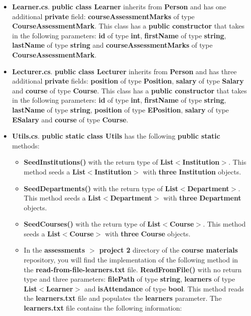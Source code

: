 \documentclass{article}
\begin{document}
\begin{itemize}
\begin{itemize}
        \item \textbf{Learner.cs}. \textbf{public class Learner} inherits from \textbf{Person} and has one additional \textbf{private} field: \textbf{courseAssessmentMarks} of type \textbf{CourseAssessmentMark}. This class has a \textbf{public constructor} that takes in the following parameters: \textbf{id} of type \textbf{int}, \textbf{firstName} of type \textbf{string}, \textbf{lastName} of type \textbf{string} and \textbf{courseAssessmentMarks} of type \textbf{CourseAssessmentMark}. 
        \item \textbf{Lecturer.cs}. \textbf{public class Lecturer} inherits from \textbf{Person} and has three additional \textbf{private} fields: \textbf{position} of type \textbf{Position}, \textbf{salary} of type \textbf{Salary} and \textbf{course} of type \textbf{Course}. This class has a \textbf{public constructor} that takes in the following parameters: \textbf{id} of type \textbf{int}, \textbf{firstName} of type \textbf{string}, \textbf{lastName} of type \textbf{string}, \textbf{position} of type \textbf{EPosition}, \textbf{salary} of type \textbf{ESalary} and \textbf{course} of type \textbf{Course}.
        \item \textbf{Utils.cs}. \textbf{public static class Utils} has the following \textbf{public static} methods:
        \begin{itemize}
            \item \textbf{SeedInstitutions()} with the return type of \textbf{List$<$Institution$>$}. This method seeds a \textbf{List$<$Institution$>$} with \textbf{three} \textbf{Institution} objects.
            \item \textbf{SeedDepartments()} with the return type of \textbf{List$<$Department$>$}. This method seeds a \textbf{List$<$Department$>$} with \textbf{three} \textbf{Department} objects.
            \item \textbf{SeedCourses()} with the return type of \textbf{List$<$Course$>$}. This method seeds a \textbf{List$<$Course$>$} with \textbf{three} \textbf{Course} objects. 
            \item In the \textbf{assessments $>$ project 2} directory of the \textbf{course materials} repository, you will find the implementation of the following method in the \textbf{read-from-file-learners.txt} file.
            \textbf{ReadFromFile()} with no return type and three parameters: \textbf{filePath} of type \textbf{string}, \textbf{learners} of type \textbf{List$<$Learner$>$} and \textbf{isAttendance} of type \textbf{bool}. This method reads the \textbf{learners.txt} file and populates the \textbf{learners} parameter. The \textbf{learners.txt} file contains the following information:\\

\end{itemize}
\end{itemize}
\end{itemize}
\end{document}
